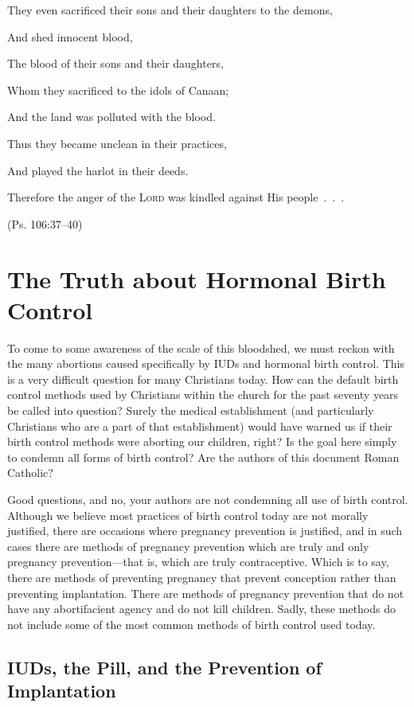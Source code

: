 \documentclass[
]{book}
\begin{document}
They even sacrificed their sons and their daughters to the demons,

And shed innocent blood,

The blood of their sons and their daughters,

Whom they sacrificed to the idols of Canaan;

And the land was polluted with the blood.

Thus they became unclean in their practices,

And played the harlot in their deeds.

Therefore the anger of the \textsc{Lord} was kindled against His people~.~.~.

(Ps. 106:37--40)

\hypertarget{the-truth-about-hormonal-birth-control}{%
\section{The Truth about Hormonal Birth Control}\label{the-truth-about-hormonal-birth-control}}

To come to some awareness of the scale of this bloodshed, we must reckon with the many abortions caused specifically by IUDs and hormonal birth control. This is a very difficult question for many Christians today. How can the default birth control methods used by Christians within the church for the past seventy years be called into question? Surely the medical establishment (and particularly Christians who are a part of that establishment) would have warned us if their birth control methods were aborting our children, right? Is the goal here simply to condemn all forms of birth control? Are the authors of this document Roman Catholic?

Good questions, and no, your authors are not condemning all use of birth control. Although we believe most practices of birth control today are not morally justified, there are occasions where pregnancy prevention is justified, and in such cases there are methods of pregnancy prevention which are truly and only pregnancy prevention---that is, which are truly contraceptive. Which is to say, there are methods of preventing pregnancy that prevent conception rather than preventing implantation. There are methods of pregnancy prevention that do not have any abortifacient agency and do not kill children. Sadly, these methods do not include some of the most common methods of birth control used today.

\hypertarget{iuds-the-pill-and-the-prevention-of-implantation}{%
\subsection{IUDs, the Pill, and the Prevention of Implantation}\label{iuds-the-pill-and-the-prevention-of-implantation}}
\end{document}

